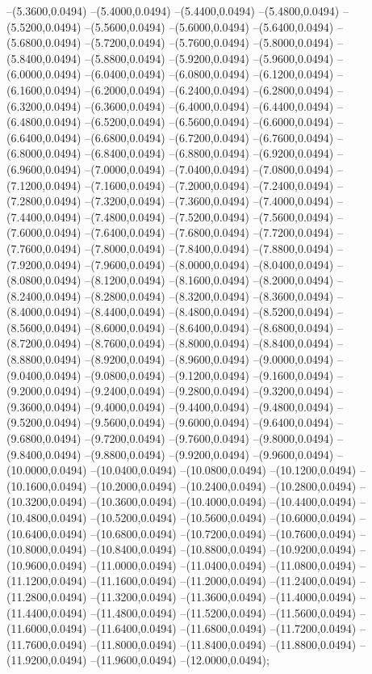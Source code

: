 {	--(5.3600,0.0494)
	--(5.4000,0.0494)
	--(5.4400,0.0494)
	--(5.4800,0.0494)
	--(5.5200,0.0494)
	--(5.5600,0.0494)
	--(5.6000,0.0494)
	--(5.6400,0.0494)
	--(5.6800,0.0494)
	--(5.7200,0.0494)
	--(5.7600,0.0494)
	--(5.8000,0.0494)
	--(5.8400,0.0494)
	--(5.8800,0.0494)
	--(5.9200,0.0494)
	--(5.9600,0.0494)
	--(6.0000,0.0494)
	--(6.0400,0.0494)
	--(6.0800,0.0494)
	--(6.1200,0.0494)
	--(6.1600,0.0494)
	--(6.2000,0.0494)
	--(6.2400,0.0494)
	--(6.2800,0.0494)
	--(6.3200,0.0494)
	--(6.3600,0.0494)
	--(6.4000,0.0494)
	--(6.4400,0.0494)
	--(6.4800,0.0494)
	--(6.5200,0.0494)
	--(6.5600,0.0494)
	--(6.6000,0.0494)
	--(6.6400,0.0494)
	--(6.6800,0.0494)
	--(6.7200,0.0494)
	--(6.7600,0.0494)
	--(6.8000,0.0494)
	--(6.8400,0.0494)
	--(6.8800,0.0494)
	--(6.9200,0.0494)
	--(6.9600,0.0494)
	--(7.0000,0.0494)
	--(7.0400,0.0494)
	--(7.0800,0.0494)
	--(7.1200,0.0494)
	--(7.1600,0.0494)
	--(7.2000,0.0494)
	--(7.2400,0.0494)
	--(7.2800,0.0494)
	--(7.3200,0.0494)
	--(7.3600,0.0494)
	--(7.4000,0.0494)
	--(7.4400,0.0494)
	--(7.4800,0.0494)
	--(7.5200,0.0494)
	--(7.5600,0.0494)
	--(7.6000,0.0494)
	--(7.6400,0.0494)
	--(7.6800,0.0494)
	--(7.7200,0.0494)
	--(7.7600,0.0494)
	--(7.8000,0.0494)
	--(7.8400,0.0494)
	--(7.8800,0.0494)
	--(7.9200,0.0494)
	--(7.9600,0.0494)
	--(8.0000,0.0494)
	--(8.0400,0.0494)
	--(8.0800,0.0494)
	--(8.1200,0.0494)
	--(8.1600,0.0494)
	--(8.2000,0.0494)
	--(8.2400,0.0494)
	--(8.2800,0.0494)
	--(8.3200,0.0494)
	--(8.3600,0.0494)
	--(8.4000,0.0494)
	--(8.4400,0.0494)
	--(8.4800,0.0494)
	--(8.5200,0.0494)
	--(8.5600,0.0494)
	--(8.6000,0.0494)
	--(8.6400,0.0494)
	--(8.6800,0.0494)
	--(8.7200,0.0494)
	--(8.7600,0.0494)
	--(8.8000,0.0494)
	--(8.8400,0.0494)
	--(8.8800,0.0494)
	--(8.9200,0.0494)
	--(8.9600,0.0494)
	--(9.0000,0.0494)
	--(9.0400,0.0494)
	--(9.0800,0.0494)
	--(9.1200,0.0494)
	--(9.1600,0.0494)
	--(9.2000,0.0494)
	--(9.2400,0.0494)
	--(9.2800,0.0494)
	--(9.3200,0.0494)
	--(9.3600,0.0494)
	--(9.4000,0.0494)
	--(9.4400,0.0494)
	--(9.4800,0.0494)
	--(9.5200,0.0494)
	--(9.5600,0.0494)
	--(9.6000,0.0494)
	--(9.6400,0.0494)
	--(9.6800,0.0494)
	--(9.7200,0.0494)
	--(9.7600,0.0494)
	--(9.8000,0.0494)
	--(9.8400,0.0494)
	--(9.8800,0.0494)
	--(9.9200,0.0494)
	--(9.9600,0.0494)
	--(10.0000,0.0494)
	--(10.0400,0.0494)
	--(10.0800,0.0494)
	--(10.1200,0.0494)
	--(10.1600,0.0494)
	--(10.2000,0.0494)
	--(10.2400,0.0494)
	--(10.2800,0.0494)
	--(10.3200,0.0494)
	--(10.3600,0.0494)
	--(10.4000,0.0494)
	--(10.4400,0.0494)
	--(10.4800,0.0494)
	--(10.5200,0.0494)
	--(10.5600,0.0494)
	--(10.6000,0.0494)
	--(10.6400,0.0494)
	--(10.6800,0.0494)
	--(10.7200,0.0494)
	--(10.7600,0.0494)
	--(10.8000,0.0494)
	--(10.8400,0.0494)
	--(10.8800,0.0494)
	--(10.9200,0.0494)
	--(10.9600,0.0494)
	--(11.0000,0.0494)
	--(11.0400,0.0494)
	--(11.0800,0.0494)
	--(11.1200,0.0494)
	--(11.1600,0.0494)
	--(11.2000,0.0494)
	--(11.2400,0.0494)
	--(11.2800,0.0494)
	--(11.3200,0.0494)
	--(11.3600,0.0494)
	--(11.4000,0.0494)
	--(11.4400,0.0494)
	--(11.4800,0.0494)
	--(11.5200,0.0494)
	--(11.5600,0.0494)
	--(11.6000,0.0494)
	--(11.6400,0.0494)
	--(11.6800,0.0494)
	--(11.7200,0.0494)
	--(11.7600,0.0494)
	--(11.8000,0.0494)
	--(11.8400,0.0494)
	--(11.8800,0.0494)
	--(11.9200,0.0494)
	--(11.9600,0.0494)
	--(12.0000,0.0494);
}
